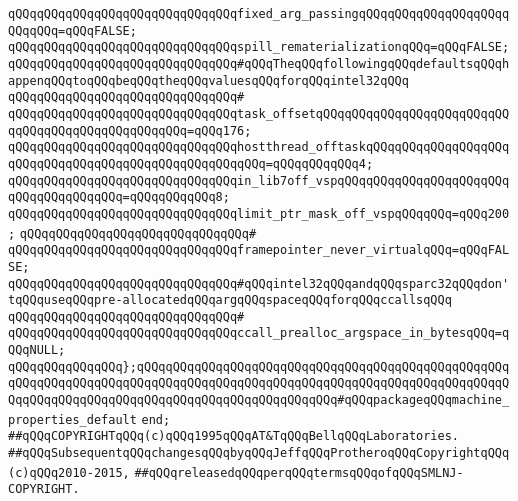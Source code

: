 \verb|qQQqqQQqqQQqqQQqqQQqqQQqqQQqqQQqfixed_arg_passingqQQqqQQqqQQqqQQqqQQqqQQqqQQq=qQQqFALSE;|\newline
\verb|qQQqqQQqqQQqqQQqqQQqqQQqqQQqqQQqspill_rematerializationqQQq=qQQqFALSE;|\newline
\newline
\verb|qQQqqQQqqQQqqQQqqQQqqQQqqQQqqQQq#qQQqTheqQQqfollowingqQQqdefaultsqQQqhappenqQQqtoqQQqbeqQQqtheqQQqvaluesqQQqforqQQqintel32qQQq|\newline
\verb|qQQqqQQqqQQqqQQqqQQqqQQqqQQqqQQq#|\newline
\verb|qQQqqQQqqQQqqQQqqQQqqQQqqQQqqQQqtask_offsetqQQqqQQqqQQqqQQqqQQqqQQqqQQqqQQqqQQqqQQqqQQqqQQqqQQq=qQQq176;|\newline
\verb|qQQqqQQqqQQqqQQqqQQqqQQqqQQqqQQqhostthread_offtaskqQQqqQQqqQQqqQQqqQQqqQQqqQQqqQQqqQQqqQQqqQQqqQQqqQQqqQQq=qQQqqQQqqQQq4;|\newline
\verb|qQQqqQQqqQQqqQQqqQQqqQQqqQQqqQQqin_lib7off_vspqQQqqQQqqQQqqQQqqQQqqQQqqQQqqQQqqQQqqQQq=qQQqqQQqqQQq8;|\newline
\verb|qQQqqQQqqQQqqQQqqQQqqQQqqQQqqQQqlimit_ptr_mask_off_vspqQQqqQQq=qQQq200;|\newline
\verb|qQQqqQQqqQQqqQQqqQQqqQQqqQQqqQQq#|\newline
\verb|qQQqqQQqqQQqqQQqqQQqqQQqqQQqqQQqframepointer_never_virtualqQQq=qQQqFALSE;|\newline
\newline
\verb|qQQqqQQqqQQqqQQqqQQqqQQqqQQqqQQq#qQQqintel32qQQqandqQQqsparc32qQQqdon'tqQQquseqQQqpre-allocatedqQQqargqQQqspaceqQQqforqQQqccallsqQQq|\newline
\verb|qQQqqQQqqQQqqQQqqQQqqQQqqQQqqQQq#|\newline
\verb|qQQqqQQqqQQqqQQqqQQqqQQqqQQqqQQqccall_prealloc_argspace_in_bytesqQQq=qQQqNULL;|\newline
\newline
\verb|qQQqqQQqqQQqqQQq};qQQqqQQqqQQqqQQqqQQqqQQqqQQqqQQqqQQqqQQqqQQqqQQqqQQqqQQqqQQqqQQqqQQqqQQqqQQqqQQqqQQqqQQqqQQqqQQqqQQqqQQqqQQqqQQqqQQqqQQqqQQqqQQqqQQqqQQqqQQqqQQqqQQqqQQqqQQqqQQqqQQqqQQq#qQQqpackageqQQqmachine_properties_default|\newline
\verb|end;|\newline
\newline
\verb|##qQQqCOPYRIGHTqQQq(c)qQQq1995qQQqAT&TqQQqBellqQQqLaboratories.|\newline
\verb|##qQQqSubsequentqQQqchangesqQQqbyqQQqJeffqQQqProtheroqQQqCopyrightqQQq(c)qQQq2010-2015,|\newline
\verb|##qQQqreleasedqQQqperqQQqtermsqQQqofqQQqSMLNJ-COPYRIGHT.|\newline

